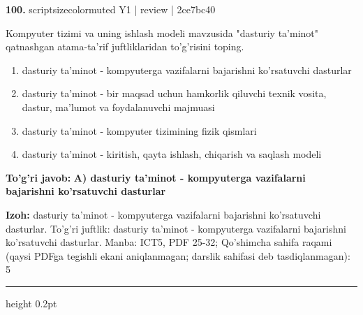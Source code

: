 \documentclass[10pt,a4paper]{article}
\begin{document}
{\bfseries\sffamily\color{ink} 100.} {scriptsizecolor{muted} Y1 | review | 2ce7bc40}
\par
Kompyuter tizimi va uning ishlash modeli mavzusida "dasturiy ta'minot" qatnashgan atama-ta'rif juftliklaridan to'g'risini toping.
\begin{enumerate}[label=\Alph*),leftmargin=9mm]
\item dasturiy ta'minot - kompyuterga vazifalarni bajarishni ko'rsatuvchi dasturlar
\item dasturiy ta'minot - bir maqsad uchun hamkorlik qiluvchi texnik vosita, dastur, ma'lumot va foydalanuvchi majmuasi
\item dasturiy ta'minot - kompyuter tizimining fizik qismlari
\item dasturiy ta'minot - kiritish, qayta ishlash, chiqarish va saqlash modeli
\end{enumerate}
\begin{tcolorbox}[enhanced,breakable,colback=teal!4,colframe=teal!60!black,boxrule=0.45pt,arc=1.2mm,left=2.7mm,right=2.7mm,top=1.8mm,bottom=1.8mm,before skip=2mm,after skip=2mm]
{\bfseries\sffamily\color{teal}To'g'ri javob:} \textbf{A) dasturiy ta'minot - kompyuterga vazifalarni bajarishni ko'rsatuvchi dasturlar}
\par\smallskip
{\bfseries Izoh:} dasturiy ta'minot - kompyuterga vazifalarni bajarishni ko'rsatuvchi dasturlar. To'g'ri juftlik: dasturiy ta'minot - kompyuterga vazifalarni bajarishni ko'rsatuvchi dasturlar. Manba: ICT5, PDF 25-32; Qo'shimcha sahifa raqami (qaysi PDFga tegishli ekani aniqlanmagan; darslik sahifasi deb tasdiqlanmagan): 5
\end{tcolorbox}
\vspace{2mm}\hrule height 0.2pt\vspace{3mm}
\end{document}
